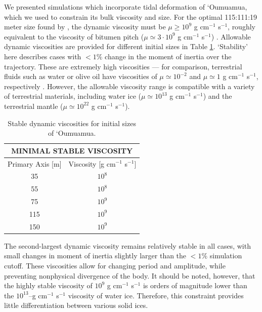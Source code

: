 \documentclass[twocolumn,doublespacing]{aastex631}
\begin{document}
We presented simulations which incorporate tidal deformation of `Oumuamua, which we used to constrain its bulk viscosity and size. For the optimal 115:111:19 meter size found by \citet{mashchenko2019}, the dynamic viscosity must be $\mu\geq10^9$ g cm$^{-1}$ s$^{-1}$, roughly equivalent to the viscosity of bitumen pitch ($\mu\simeq 3\cdot10^9$ g cm$^{-1}$ s$^{-1}$) \citep{edgeworth1984}. Allowable dynamic viscosities are provided for different initial sizes in Table \ref{table:allowedviscosities}. `Stability' here describes cases with $<1\%$ change in the moment of inertia over the trajectory. These are extremely high viscosities --- for comparison, terrestrial fluids such as water or olive oil have viscosities of $\mu\simeq10^{-2}$ and $\mu\simeq1$ g cm$^{-1}$ s$^{-1}$, respectively \citep{crc2022,fellows2022}. However, the allowable viscosity range is compatible with a variety of terrestrial materials, including water ice ($\mu\simeq 10^{13}$ g cm$^{-1}$ s$^{-1}$) \citep{fowler1997} and the terrestrial mantle ($\mu\simeq 10^{22}$ g cm$^{-1}$ s$^{-1}$).

\begin{table}
\begin{tabular}{ |c|c| } 
 \hline
 \multicolumn{2}{||c||}{MINIMAL STABLE VISCOSITY} \\
 \hline\hline
 Primary Axis [m] & Viscosity [g cm$^{-1}$ s$^{-1}$] \\
 \hline\hline
 35 & $10^8$ \\
 \hline
 55 & $10^8$ \\
 \hline 
 75 & $10^9$ \\
 \hline
 115 & $10^9$ \\
 \hline
 150 & $10^9$ \\
 \hline
\end{tabular}
\caption{Stable dynamic viscosities for initial sizes of `Oumuamua.}
\label{table:allowedviscosities}
\end{table}

The second-largest dynamic viscosity remains relatively stable in all cases, with small changes in moment of inertia slightly larger than the $<1\%$ simulation cutoff. These viscosities allow for changing period and amplitude, while preventing nonphysical divergence of the body. It should be noted, however, that the highly stable viscosity of $10^9$ g cm$^{-1}$ s$^{-1}$ is orders of magnitude lower than the $10^{13}$--g cm$^{-1}$ s$^{-1}$ viscosity of water ice. Therefore, this constraint provides little differentiation between various solid ices.
\end{document}
